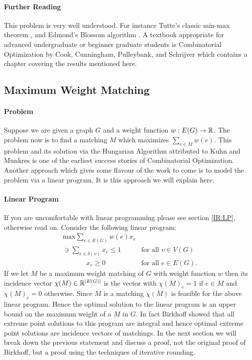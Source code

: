 \paragraph{Further Reading}
This problem is very well understood. For instance Tutte's classic min-max theorem \cite{tutte1947factorization}, and Edmond's Blossom algorithm \cite{edmonds1965paths}. A textbook appropriate for advanced undergraduate or beginner graduate students is Combinatorial Optimization by Cook, Cunningham, Pulleybank, and Schrijver \cite{cook2009combinatorial} which contains a chapter covering the results mentioned here.
\subsection{Maximum Weight Matching}\label{GT:MWM}
\paragraph{Problem} Suppose we are given a graph $G$ and a weight function $w : E(G) \rightarrow \mathbb{R}$. The problem now is to find a matching $M$ which maximizes $\sum_{e \in M} w(e)$. This problem and its solution via the Hungarian Algorithm attributed to Kuhn and Munkres \cite{kuhn1955hungarian}\cite{munkres1957algorithms} is one of the earliest success stories of Combinatorial Optimization. Another approach which gives some flavour of the work to come is to model the problem via a linear program. It is this approach we will explain here.
\paragraph{Linear Program}
If you are uncomfortable with linear programming please see section \ref{IR:LP}, otherwise read on. Consider the following linear program:
\begin{align*}
	&\text{max} \sum_{e \in E(G)} w(e) x_e \\
	&\ni \sum_{e \in \delta(v)} x_e \leq 1 &\text{for all $v \in V(G)$} \\
	&\quad\quad\quad\ \ x_e \geq 0 &\text{for all $e \in E(G)$.}
\end{align*}
If we let $M$ be a maximum weight matching of $G$ with weight function $w$ then its incidence vector $\chi(M) \in \mathbb{R}^{|E(G)|}$ is the vector with $\chi(M)_e = 1$ if $e \in M$ and $\chi(M)_e = 0$ otherwise. Since $M$ is a matching $\chi(M)$ is feasible for the above linear program. Hence the optimal solution to the linear program is an upper bound on the maximum weight of a $M$ in $G$. In fact Birkhoff \cite{birkhoff1946tres} showed that all extreme point solutions to this program are integral and hence optimal extreme point solutions are incidence vectors of matchings. In the next section we will break down the previous statement and discuss a proof, not the original proof of Birkhoff, but a proof using the techniques of iterative rounding.
